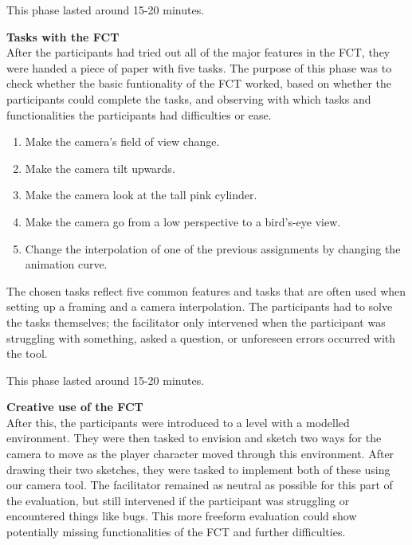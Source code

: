 This phase lasted around 15-20 minutes.

\textbf{Tasks with the FCT}\\
After the participants had tried out all of the major features in the FCT, they were handed a piece of paper with five tasks. The purpose of this phase was to check whether the basic funtionality of the FCT worked, based on whether the participants could complete the tasks, and observing with which tasks and functionalities the participants had difficulties or ease.


\begin{enumerate}
\item Make the camera's field of view change.
\item Make the camera tilt upwards.
\item Make the camera look at the tall pink cylinder.
\item Make the camera go from a low perspective to a bird's-eye view.
\item Change the interpolation of one of the previous assignments by changing the animation curve.
\end{enumerate} 

The chosen tasks reflect five common features and tasks that are often used when setting up a framing and a camera interpolation. The participants had to solve the tasks themselves; the facilitator only intervened when the participant was struggling with something, asked a question, or unforeseen errors occurred with the tool.

This phase lasted around 15-20 minutes.

\textbf{Creative use of the FCT}\\
After this, the participants were introduced to a level with a modelled environment. They were then tasked to envision and sketch two ways for the camera to move as the player character moved through this environment. After drawing their two sketches, they were tasked to implement both of these using our camera tool. The facilitator remained as neutral as possible for this part of the evaluation, but still intervened if the participant was struggling or encountered things like bugs. This more freeform evaluation could show potentially missing functionalities of the FCT and further difficulties.

